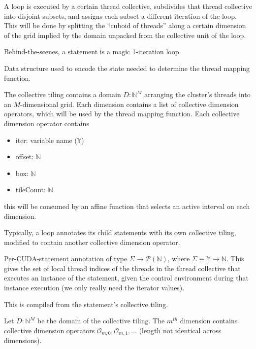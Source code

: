 
A  loop is executed by a certain thread collective, subdivides that thread collective into disjoint subsets, and assigns each subset a different iteration of the loop.
This will be done by splitting the ``cuboid of threads'' along a certain dimension of the grid implied by the domain unpacked from the collective unit of the  loop.

Behind-the-scenes, a  statement is a magic 1-iteration  loop.


Data structure used to encode the state needed to determine the thread mapping function.

The collective tiling contains a domain $D: \mathbb{N}^M$ arranging the cluster's threads into an $M$-dimensional grid.
Each dimension contains a list of collective dimension operators, which will be used by the thread mapping function.
Each collective dimension operator contains
\begin{itemize}
  \item iter: variable name ($\mathbb{Y}$)
  \item offset: $\mathbb{N}$
  \item box: $\mathbb{N}$
  \item tileCount: $\mathbb{N}$
\end{itemize}
this will be consumed by an affine function that selects an active interval on each dimension.

Typically, a  loop annotates its child statements with its own collective tiling, modified to contain another collective dimension operator.


Per-CUDA-statement annotation of type $\Sigma \to \mathcal{P}(\mathbb{N})$, where $\Sigma \equiv \mathbb{Y} \to \mathbb{N}$.
This gives the set of local thread indices of the threads in the thread collective that executes an instance of the statement, given the control environment during that instance execution (we only really need the  iterator values).

This is compiled from the statement's collective tiling.

Let $D: \mathbb{N}^M$ be the domain of the collective tiling.
The $m^{th}$ dimension contains collective dimension operators $\mathcal{O}_{m,0}, \mathcal{O}_{m,1}, ...$ (length not identical across dimensions).

